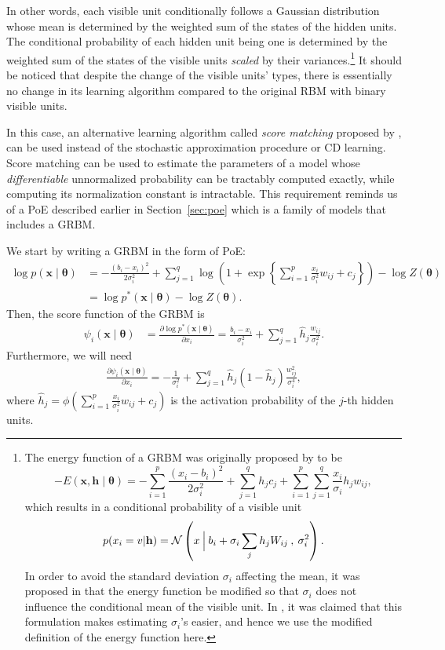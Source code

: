 \documentclass[dissertation,nocontribution]{aaltoseries}
\newcommand{\vect}[1]{\mathbf{#1}}
\newcommand{\vects}[1]{\boldsymbol{#1}}
\newcommand{\vh}[0]{\vect{h}}
\newcommand{\vx}[0]{\vect{x}}
\newcommand{\TT}[0]{{\vects{\theta}}}
\newcommand{\N}[0]{\mathcal{N}}
\begin{document}
In other words, each visible unit conditionally follows a
Gaussian distribution whose mean is determined by the
weighted sum of the states of the hidden units. The
conditional probability of each hidden unit being one is
determined by the weighted sum of the states of the visible
units \textit{scaled} by their variances.\footnote{
The energy function of a GRBM was originally proposed by
\citet{Hinton2006} to be
\[
    -E(\vx, \vh \mid \TT) = -\sum_{i=1}^p \frac{(x_i -
    b_i)^2}{2\sigma_i^2} + \sum_{j=1}^q h_j c_j +
    \sum_{i=1}^p \sum_{j=1}^q \frac{x_i}{\sigma_i} h_j
    w_{ij},
\]
which results in a conditional probability of a visible unit 
\[
p(x_i = v | \vh) = \N \left(x \:\Bigl|\: b_i + 
\sigma_i \sum_j h_j W_{ij} \:,\: \sigma_i^2 \right).
\]
In order to avoid the standard deviation $\sigma_i$
affecting the mean, it was proposed in
 that the energy function be modified
so that $\sigma_i$ does not influence the conditional mean
of the visible unit.  In , it was
claimed that this formulation makes estimating $\sigma_i$'s
easier, and hence we use the modified definition of the energy
function here.
}
It should be noticed that despite the change of the visible
units' types, there is essentially no change in its learning
algorithm compared to the original RBM with binary visible
units.

In this case, an alternative learning algorithm called
\textit{score matching} proposed by \citet{Hyvarinen2005},
can be used instead of the stochastic approximation
procedure or CD learning. Score matching can be used to
estimate the parameters of a model whose
\textit{differentiable} unnormalized probability can be
tractably computed exactly, while computing its
normalization constant is intractable. This requirement
reminds us of a PoE described earlier in
Section~\ref{sec:poe} which is a family of models that
includes a GRBM.

We start by writing a GRBM in the form of PoE:
\begin{align}
    \label{eq:grbm_poe}
    \log p(\vx \mid \TT) &= -\frac{(b_i - x_i)^2}{2\sigma_i^2}
    + \sum_{j=1}^q \log \left( 1 + \exp\left\{ \sum_{i=1}^p
    \frac{x_i}{\sigma_i^2} w_{ij} + c_j \right\}\right) -
    \log Z(\TT) 
    \nonumber \\
    &= \log p^*(\vx \mid \TT)  - \log Z(\TT).
\end{align}
Then, the score function of the GRBM is
\begin{align}
    \label{eq:grbm_score}
    \psi_i (\vx \mid \TT) &= \frac{\partial \log p^*(\vx \mid
    \TT)}{\partial x_i} 
    = \frac{b_i - x_i}{\sigma_i^2} + \sum_{j=1}^q \hat{h}_j
    \frac{w_{ij}}{\sigma_i^2}.
\end{align}
Furthermore, we will need
\begin{align*}
    \frac{\partial \psi_i(\vx \mid \TT)}{\partial x_i} =
    -\frac{1}{\sigma_i^2} + \sum_{j=1}^q \hat{h}_j (1 -
    \hat{h}_j) \frac{w_{ij}^2}{\sigma_i^4},
\end{align*}
where $\hat{h}_j = \phi\left( \sum_{i=1}^p
\frac{x_i}{\sigma_i^2} w_{ij} + c_j \right)$ is the
activation probability of the $j$-th hidden units.
\end{document}
